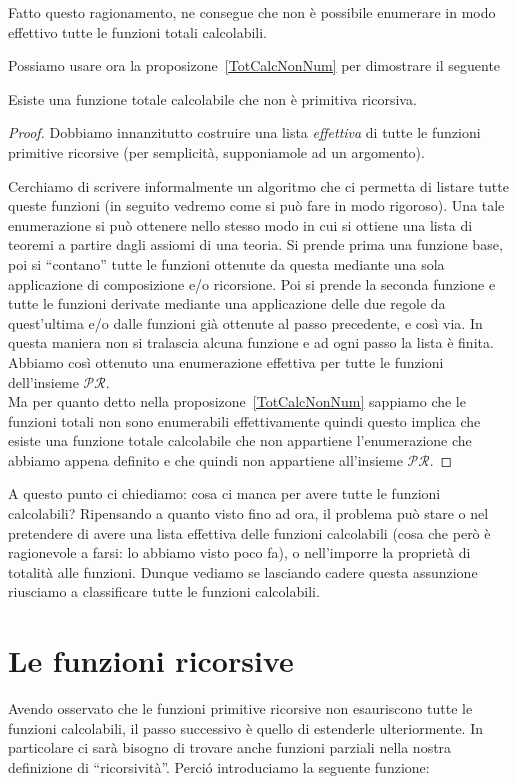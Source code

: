 Fatto questo ragionamento, ne consegue che non è possibile enumerare
in modo effettivo tutte le funzioni totali calcolabili.

Possiamo usare ora la proposizone~\ref{TotCalcNonNum} per dimostrare il seguente

\begin{thm}\label{diagRic} Esiste una funzione totale calcolabile che non
è primitiva ricorsiva.
\end{thm}

\begin{proof}
Dobbiamo innanzitutto costruire una lista \emph{effettiva} di tutte le
funzioni primitive ricorsive (per semplicit\`a, supponiamole ad un
argomento).

Cerchiamo di scrivere informalmente un algoritmo che ci permetta di
listare tutte queste funzioni (in seguito vedremo come si pu\`o fare
in modo rigoroso).  Una tale enumerazione si pu\`o ottenere nello
stesso modo in cui si ottiene una lista di teoremi a partire dagli
assiomi di una teoria. Si prende prima una funzione base, poi si
``contano'' tutte le funzioni ottenute da questa mediante una sola
applicazione di composizione e/o ricorsione. Poi si prende la seconda
funzione e tutte le funzioni derivate mediante una applicazione delle
due regole da quest'ultima e/o dalle funzioni gi\`a ottenute al passo
precedente, e cos\`i via. In questa maniera non si tralascia alcuna
funzione e ad ogni passo la lista \`e finita. Abbiamo cos\`i ottenuto
una enumerazione effettiva per tutte le funzioni dell'insieme
$\mathcal{PR}$.\\ Ma per quanto detto nella
proposizone~\ref{TotCalcNonNum} sappiamo che le funzioni totali non
sono enumerabili effettivamente quindi questo implica che esiste una
funzione totale calcolabile che non appartiene l'enumerazione che
abbiamo appena definito e che quindi non appartiene all'insieme
$\mathcal{PR}$.
\end{proof}

A questo punto ci chiediamo: cosa ci manca per avere tutte le funzioni
calcolabili?
Ripensando a quanto visto fino ad ora, il problema pu\`o stare o nel pretendere
di avere una lista effettiva delle funzioni calcolabili (cosa che per\`o \`e
ragionevole a farsi: lo abbiamo visto poco fa), o nell'imporre la propriet\`a di
totalit\`a alle funzioni. Dunque vediamo se lasciando cadere questa assunzione
riusciamo a classificare tutte le funzioni calcolabili.


\section{Le funzioni ricorsive}
Avendo osservato che le funzioni primitive ricorsive non
esauriscono tutte le funzioni calcolabili, il passo successivo \`e  quello di
estenderle ulteriormente. In particolare ci sar\`a bisogno di trovare
anche funzioni parziali nella nostra definizione di ``ricorsivit\`a''. Perci\'o
introduciamo
la seguente funzione: \\

